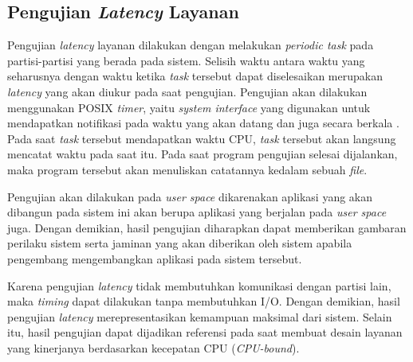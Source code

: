 \subsection{Pengujian \textit{Latency} Layanan}
\label{section:pengujian_latency}

Pengujian \textit{latency} layanan dilakukan dengan melakukan \textit{periodic task} pada
partisi-partisi yang berada pada sistem. Selisih waktu antara waktu yang seharusnya dengan waktu
ketika \textit{task} tersebut dapat diselesaikan merupakan \textit{latency} yang akan diukur
pada saat pengujian. Pengujian akan dilakukan menggunakan POSIX \textit{timer}, yaitu
\textit{system interface} yang digunakan untuk mendapatkan notifikasi pada waktu yang akan
datang dan juga secara berkala \citep{POSIX}. Pada saat \textit{task} tersebut mendapatkan waktu
CPU, \textit{task} tersebut akan langsung mencatat waktu pada saat itu. Pada saat program
pengujian selesai dijalankan, maka program tersebut akan menuliskan catatannya kedalam sebuah
\textit{file}.

Pengujian akan dilakukan pada \textit{user space} dikarenakan aplikasi yang akan dibangun pada
sistem ini akan berupa aplikasi yang berjalan pada \textit{user space} juga. Dengan demikian,
hasil pengujian diharapkan dapat memberikan gambaran perilaku sistem serta jaminan yang akan
diberikan oleh sistem apabila pengembang mengembangkan aplikasi pada sistem tersebut.

Karena pengujian \textit{latency} tidak membutuhkan komunikasi dengan partisi lain, maka
\textit{timing} dapat dilakukan tanpa membutuhkan I/O. Dengan demikian, hasil pengujian
\textit{latency} merepresentasikan kemampuan maksimal dari sistem. Selain itu, hasil pengujian
dapat dijadikan referensi pada saat membuat desain layanan yang kinerjanya berdasarkan kecepatan
CPU (\textit{CPU-bound}).

